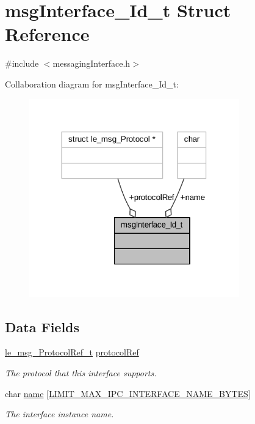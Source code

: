 \hypertarget{structmsg_interface___id__t}{}\section{msg\+Interface\+\_\+\+Id\+\_\+t Struct Reference}
\label{structmsg_interface___id__t}


{\ttfamily \#include $<$messaging\+Interface.\+h$>$}



Collaboration diagram for msg\+Interface\+\_\+\+Id\+\_\+t\+:
\nopagebreak
\begin{figure}[H]
\begin{center}
\leavevmode
\includegraphics[width=258pt]{structmsg_interface___id__t__coll__graph}
\end{center}
\end{figure}
\subsection*{Data Fields}
\begin{DoxyCompactItemize}
\item 
\hyperlink{le__messaging_8h_ac05e9b3268f8fb5776adab6fe11410e5}{le\+\_\+msg\+\_\+\+Protocol\+Ref\+\_\+t} \hyperlink{structmsg_interface___id__t_a7afc3e4059efbf1bbe9353230f98aff2}{protocol\+Ref}
\begin{DoxyCompactList}\small\item\em The protocol that this interface supports. \end{DoxyCompactList}\item 
char \hyperlink{structmsg_interface___id__t_a25a5cbcc6de98932eea62f2044395d4f}{name} \mbox{[}\hyperlink{limit_8h_a06cfcaef1596f177e04ea0a131257c01}{L\+I\+M\+I\+T\+\_\+\+M\+A\+X\+\_\+\+I\+P\+C\+\_\+\+I\+N\+T\+E\+R\+F\+A\+C\+E\+\_\+\+N\+A\+M\+E\+\_\+\+B\+Y\+T\+ES}\mbox{]}
\begin{DoxyCompactList}\small\item\em The interface instance name. \end{DoxyCompactList}\end{DoxyCompactItemize}


